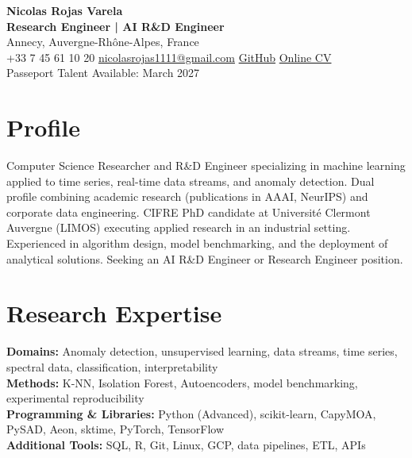 \documentclass[12pt,a4paper]{article}
\begin{document}
{\centering
{\LARGE\textbf{Nicolas Rojas Varela}}\\[0.5mm]
{\large\textbf{Research Engineer | AI R\&D Engineer}}\\[0.5mm]
Annecy, Auvergne-Rhône-Alpes, France\\
+33 7 45 61 10 20 \textbar{} \href{mailto:nicolasrojas1111@gmail.com}{nicolasrojas1111@gmail.com} \textbar{} \href{https://github.com/nirojasva}{GitHub} \textbar{} \href{https://nirojasva.github.io/cv/}{Online CV}\\
Passeport Talent \textbar{} Available: March 2027\par}
\vspace{1pt}

\section*{Profile}
Computer Science Researcher and R\&D Engineer specializing in machine learning applied to time series, real-time data streams, and anomaly detection. Dual profile combining academic research (publications in AAAI, NeurIPS) and corporate data engineering. CIFRE PhD candidate at Université Clermont Auvergne (LIMOS) executing applied research in an industrial setting. Experienced in algorithm design, model benchmarking, and the deployment of analytical solutions. Seeking an AI R\&D Engineer or Research Engineer position.

\section*{Research Expertise}
\textbf{Domains:} Anomaly detection, unsupervised learning, data streams, time series, spectral data, classification, interpretability\\
\textbf{Methods:} K-NN, Isolation Forest, Autoencoders, model benchmarking, experimental reproducibility\\
\textbf{Programming \& Libraries:} Python (Advanced), scikit-learn, CapyMOA, PySAD, Aeon, sktime, PyTorch, TensorFlow\\
\textbf{Additional Tools:} SQL, R, Git, Linux, GCP, data pipelines, ETL, APIs
\end{document}
